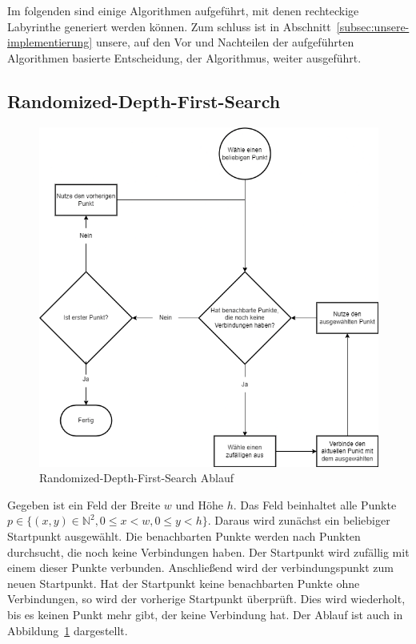 Im folgenden sind einige Algorithmen aufgeführt, mit denen rechteckige Labyrinthe generiert werden können.
Zum schluss ist in Abschnitt~\ref{subsec:unsere-implementierung} unsere, auf den Vor\- und Nachteilen der aufgeführten Algorithmen basierte Entscheidung, der  Algorithmus, weiter ausgeführt.
\subsection{Randomized-Depth-First-Search}\label{subsec:randomized-depth-first-search}
    \begin{figure}[ht!]
        \centering
        \includegraphics[width=\paperwidth/2]{../assets/img/Randomised-Depth-First-Search}
        \caption{Randomized-Depth-First-Search Ablauf}
        \label{fig:randomized-depth-first-search-flow}
    \end{figure}
    Gegeben ist ein Feld der Breite $w$ und Höhe $h$.
    Das Feld beinhaltet alle Punkte $p\in\{(x,y)\in\mathbb{N}^2, 0\leq x<w, 0\leq y<h\}$.
    Daraus wird zunächst ein beliebiger Startpunkt ausgewählt.
    Die benachbarten Punkte werden nach Punkten durchsucht, die noch keine Verbindungen haben.
    Der Startpunkt wird zufällig mit einem dieser Punkte verbunden.
    Anschließend wird der verbindungspunkt zum neuen Startpunkt.
    Hat der Startpunkt keine benachbarten Punkte ohne Verbindungen, so wird der vorherige Startpunkt überprüft.
    Dies wird wiederholt, bis es keinen Punkt mehr gibt, der keine Verbindung hat.
    Der Ablauf ist auch in Abbildung~\ref{fig:randomized-depth-first-search-flow} dargestellt.

